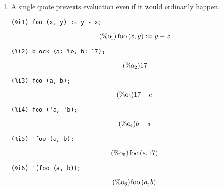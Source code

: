 \documentclass[12pt,leqno]{article}
\begin{document}
\begin{enumerate}
\item A single quote prevents evaluation even if it would ordinarily happen.
\begin{verbatim}
(%i1) foo (x, y) := y - x;
\end{verbatim}
\begin{equation}
\tag{$\mathop{\mathrm{\%o}}_{1}$}\mathop{\mathrm{foo}}\left(x, y\right) := y-x
\label{eq:doc-group1-code16-1-1}
\end{equation}
\begin{verbatim}
(%i2) block (a: %e, b: 17);
\end{verbatim}
\begin{equation}
\tag{$\mathop{\mathrm{\%o}}_{2}$}17
\label{eq:doc-group1-code16-2-1}
\end{equation}
\begin{verbatim}
(%i3) foo (a, b);
\end{verbatim}
\begin{equation}
\tag{$\mathop{\mathrm{\%o}}_{3}$}17-e
\label{eq:doc-group1-code16-3-1}
\end{equation}
\begin{verbatim}
(%i4) foo ('a, 'b);
\end{verbatim}
\begin{equation}
\tag{$\mathop{\mathrm{\%o}}_{4}$}b-a
\label{eq:doc-group1-code16-4-1}
\end{equation}
\begin{verbatim}
(%i5) 'foo (a, b);
\end{verbatim}
\begin{equation}
\tag{$\mathop{\mathrm{\%o}}_{5}$}\mathop{\mathrm{foo}}\left(e, 17\right)
\label{eq:doc-group1-code16-5-1}
\end{equation}
\begin{verbatim}
(%i6) '(foo (a, b));
\end{verbatim}
\begin{equation}
\tag{$\mathop{\mathrm{\%o}}_{6}$}\mathop{\mathrm{foo}}\left(a, b\right)
\label{eq:doc-group1-code16-6-1}
\end{equation}



\end{enumerate}
\end{document}
